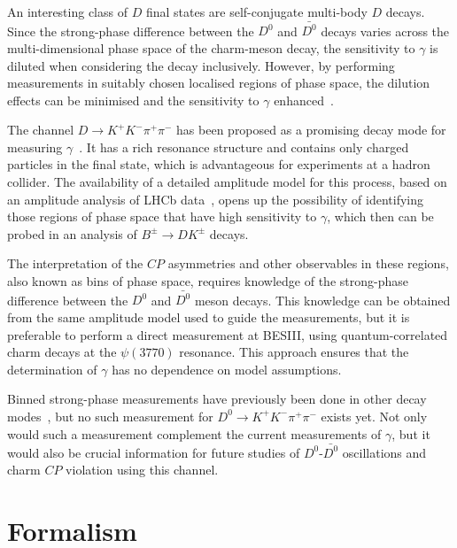 \documentclass[12pt, a4paper, notitlepage, onecolumn]{article}
\begin{document}
An interesting class of $D$ final states are self-conjugate multi-body $D$ decays. Since the strong-phase difference between the $D^0$ and $\bar{D^0}$ decays varies across the multi-dimensional phase space of the charm-meson decay, the sensitivity to $\gamma$ is diluted when considering the decay inclusively. However, by performing measurements in suitably chosen localised regions of phase space, the dilution effects can be minimised and the sensitivity to $\gamma$ enhanced~\cite{BondarPoluektov2008,GiriGrossmanSofferZupan}.

The channel $D\to K^+K^-\pi^+\pi^-$ has been proposed as a promising decay mode for measuring $\gamma$~\cite{cite:RademackerWilkinson}. It has a rich resonance structure and contains only charged particles in the final state, which is advantageous for experiments at a hadron collider. The availability of a detailed amplitude model for this process, based on an amplitude analysis of LHCb data~\cite{LHCb-PAPER-2018-041}, opens up the possibility of identifying those regions of phase space that have high sensitivity to $\gamma$, which then can be probed in an analysis of $B^\pm\to DK^\pm$ decays.

The interpretation of the $C\!P$ asymmetries and other observables in these regions, also known as bins of phase space, requires knowledge of the strong-phase difference between the $D^0$ and $\bar{D^0}$ meson decays. This knowledge can be obtained from the same amplitude model used to guide the measurements, but it is preferable to perform a direct measurement at BESIII, using quantum-correlated charm decays at the $\psi(3770)$ resonance. This approach ensures that the determination of $\gamma$ has no dependence on model assumptions. 

Binned strong-phase measurements have previously been done in other decay modes~\cite{LHCb-PAPER-2020-019}, but no such measurement for $D^0\to K^+K^-\pi^+\pi^-$ exists yet. Not only would such a measurement complement the current measurements of $\gamma$, but it would also be crucial information for future studies of $D^0$-$\bar{D^0}$ oscillations and charm $C\!P$ violation using this channel.

\section{Formalism}
\end{document}
